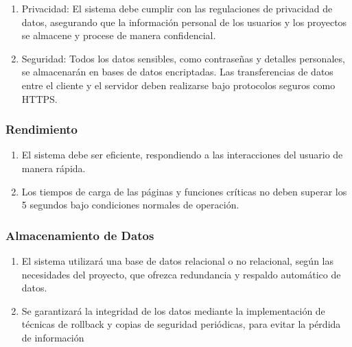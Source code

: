 	\begin{enumerate}
		\item Privacidad: El sistema debe cumplir con las regulaciones de privacidad
			de datos, asegurando que la información personal de los usuarios y los proyectos
			se almacene y procese de manera confidencial.

		\item Seguridad: Todos los datos sensibles, como contraseñas y detalles personales,
			se almacenarán en bases de datos encriptadas. Las transferencias de datos entre
			el cliente y el servidor deben realizarse bajo protocolos seguros como HTTPS.
	\end{enumerate}

	\subsubsection{Rendimiento}

	\begin{enumerate}
		\item El sistema debe ser eficiente, respondiendo a las interacciones del
			usuario de manera rápida.

		\item Los tiempos de carga de las páginas y funciones críticas no deben superar
			los 5 segundos bajo condiciones normales de operación.
	\end{enumerate}

	\subsubsection{Almacenamiento de Datos}

	\begin{enumerate}
		\item El sistema utilizará una base de datos relacional o no relacional,
			según las necesidades del proyecto, que ofrezca redundancia y respaldo automático
			de datos.

		\item Se garantizará la integridad de los datos mediante la implementación de
			técnicas de rollback y copias de seguridad periódicas, para evitar la
			pérdida de información
	\end{enumerate}

